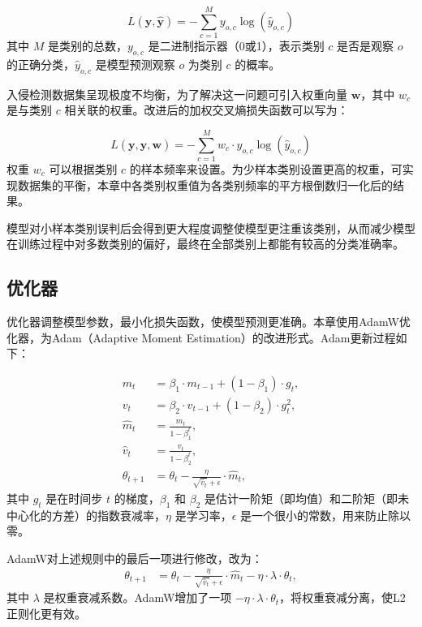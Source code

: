 \begin{equation}
L(\mathbf{y}, \mathbf{\hat{y}}) = -\sum_{c=1}^M y_{o,c} \log(\hat{y}_{o,c})
\end{equation}
其中 $M$ 是类别的总数，$y_{o,c}$ 是二进制指示器（0或1），表示类别 $c$ 是否是观察 $o$ 的正确分类，$\hat{y}_{o,c}$ 是模型预测观察 $o$ 为类别 $c$ 的概率。

入侵检测数据集呈现极度不均衡，为了解决这一问题可引入权重向量 $\mathbf{w}$，其中 $w_c$ 是与类别 $c$ 相关联的权重。改进后的加权交叉熵损失函数可以写为：

\begin{equation}
L(\mathbf{y}, \mathbf{\hat{y}}, \mathbf{w}) = -\sum_{c=1}^M w_c \cdot y_{o,c} \log(\hat{y}_{o,c})
\end{equation}
权重 $w_c$ 可以根据类别 $c$ 的样本频率来设置。为少样本类别设置更高的权重，可实现数据集的平衡，本章中各类别权重值为各类别频率的平方根倒数归一化后的结果。

模型对小样本类别误判后会得到更大程度调整使模型更注重该类别，从而减少模型在训练过程中对多数类别的偏好，最终在全部类别上都能有较高的分类准确率。

\subsection{优化器}
优化器调整模型参数，最小化损失函数，使模型预测更准确。本章使用AdamW优化器，为Adam（Adaptive Moment Estimation）的改进形式。Adam更新过程如下：

\begin{equation}
\begin{aligned}
m_t &= \beta_1 \cdot m_{t-1} + (1 - \beta_1) \cdot g_t, \\
v_t &= \beta_2 \cdot v_{t-1} + (1 - \beta_2) \cdot g_t^2, \\
\hat{m}_t &= \frac{m_t}{1 - \beta_1^t}, \\
\hat{v}_t &= \frac{v_t}{1 - \beta_2^t}, \\
\theta_{t+1} &= \theta_t - \frac{\eta}{\sqrt{\hat{v}_t} + \epsilon} \cdot \hat{m}_t,
\end{aligned}
\end{equation}
其中 $g_t$ 是在时间步 $t$ 的梯度，$\beta_1$ 和 $\beta_2$ 是估计一阶矩（即均值）和二阶矩（即未中心化的方差）的指数衰减率，$\eta$ 是学习率，$\epsilon$ 是一个很小的常数，用来防止除以零。

AdamW对上述规则中的最后一项进行修改，改为：
\begin{equation}
\begin{aligned}
\theta_{t+1} &= \theta_t - \frac{\eta}{\sqrt{\hat{v}_t} + \epsilon} \cdot \hat{m}_t - \eta \cdot \lambda \cdot \theta_t,
\end{aligned}
\end{equation}
其中 $\lambda$ 是权重衰减系数。AdamW增加了一项 $- \eta \cdot \lambda \cdot \theta_t$，将权重衰减分离，使L2正则化更有效。


